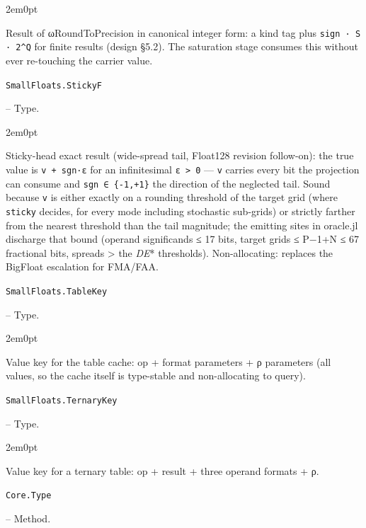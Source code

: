 \begin{adjustwidth}{2em}{0pt}

Result of ωRoundToPrecision in canonical integer form: a kind tag plus \texttt{sign · S · 2{\textasciicircum}Q} for finite results (design §5.2). The saturation stage consumes this without ever re-touching the carrier value.



\end{adjustwidth}
\hypertarget{16066611238377189300}{\texttt{SmallFloats.StickyF}}  -- {Type.}

\begin{adjustwidth}{2em}{0pt}

Sticky-head exact result (wide-spread tail, Float128 revision follow-on): the true value is \texttt{v + sgn·ε} for an infinitesimal \texttt{ε > 0} — \texttt{v} carries every bit the projection can consume and \texttt{sgn ∈ \{-1,+1\}} the direction of the neglected tail. Sound because \texttt{v} is either exactly on a rounding threshold of the target grid (where \texttt{sticky} decides, for every mode including stochastic sub-grids) or strictly farther from the nearest threshold than the tail magnitude; the emitting sites in oracle.jl discharge that bound (operand significands ≤ 17 bits, target grids ≤ P−1+N ≤ 67 fractional bits, spreads > the \emph{DE}* thresholds). Non-allocating: replaces the BigFloat escalation for FMA/FAA.



\end{adjustwidth}
\hypertarget{261438848462006089}{\texttt{SmallFloats.TableKey}}  -- {Type.}

\begin{adjustwidth}{2em}{0pt}

Value key for the table cache: op + format parameters + ρ parameters (all values, so the cache itself is type-stable and non-allocating to query).



\end{adjustwidth}
\hypertarget{3589516491715718078}{\texttt{SmallFloats.TernaryKey}}  -- {Type.}

\begin{adjustwidth}{2em}{0pt}

Value key for a ternary table: op + result + three operand formats + ρ.



\end{adjustwidth}
\hypertarget{3431767106840558017}{\texttt{Core.Type}}  -- {Method.}

